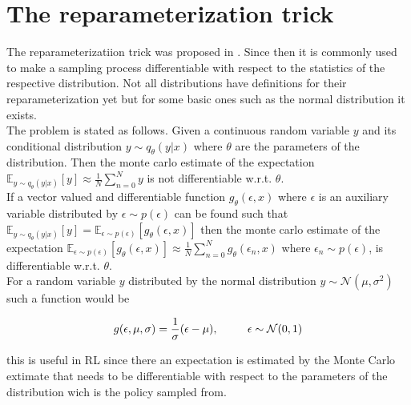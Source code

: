 \section{The reparameterization trick} \label{ssec:reparam}
The reparameterizatiion trick was proposed in \cite{kingma2013autoencoding}. Since then it is commonly used to make a sampling process differentiable with respect to the statistics of the respective distribution. Not all distributions have definitions for their reparameterization yet but for some basic ones such as the normal distribution it exists.\\
The problem is stated as follows. Given a continuous random variable $y$ and its conditional distribution $y\sim q_{\theta}(y|x)$ where $\theta$ are the parameters of the distribution. Then the monte carlo estimate of the expectation $\mathbb{E}_{y \sim q_{\theta}(y|x)}[y] \approx \frac{1}{N}\sum_{n=0}^N y$ is not differentiable w.r.t. $\theta$.\\

If a vector valued and differentiable function $g_{\theta}(\epsilon, x)$ where $\epsilon$ is an auxiliary variable distributed by $\epsilon \sim p(\epsilon)$ can be found such that $\mathbb{E}_{y\sim q_{\theta}(y|x)}[y] = \mathbb{E}_{\epsilon\sim p(\epsilon)}[g_{\theta}(\epsilon, x)]$ then the monte carlo estimate of the expectation $\mathbb{E}_{\epsilon\sim p(\epsilon)}[g_{\theta}(\epsilon, x)] \approx \frac{1}{N}\sum_{n=0}^N g_{\theta}(\epsilon_n, x)$ where $\epsilon_n \sim p(\epsilon)$, is differentiable w.r.t. $\theta$.\\

For a random variable $y$ distributed by the normal distribution $y \sim \mathcal{N}(\mu, \sigma^2)$ such a function would be

\begin{align}
	g(\epsilon, \mu, \sigma) = \frac{1}{\sigma}(\epsilon - \mu), \text{\hspace{8mm} $\epsilon \sim \mathcal{N}(0, 1)$}
\end{align}

this is useful in RL since there an expectation is estimated by the Monte Carlo extimate that needs to be differentiable with respect to the parameters of the distribution wich is the policy sampled from.